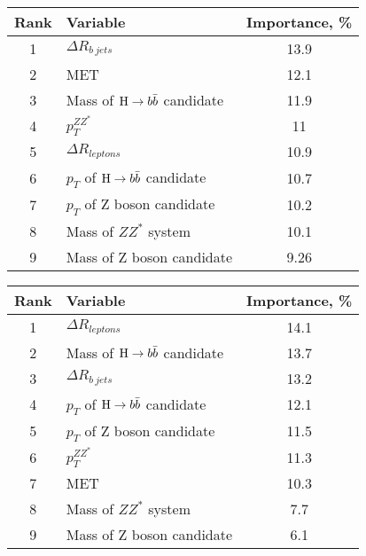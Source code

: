 \noindent\begin{table}
   \centering
   \begin{tabular}{|c| l |c|}\hline
     Rank & Variable & Importance, \% \\\hline
     1 & $\Delta R_{b\ jets}$ & 13.9 \\ 
     2 & MET & 12.1 \\ 
     3 & Mass of $\mathrm{H}\to b\bar{b}$ candidate & 11.9 \\ 
     4 & $p_T^{ZZ^*}$ & 11 \\ 
     5 & $\Delta R_{leptons}$ & 10.9 \\ 
     6 & $p_T$ of $\mathrm{H}\to b\bar{b}$ candidate & 10.7 \\ 
     7 & $p_T$ of Z boson candidate & 10.2 \\ 
     8 & Mass of $ZZ^*$ system & 10.1 \\ 
     9 & Mass of Z boson candidate & 9.26 \\ 
     \hline
   \end{tabular}
   \label{tab:test1}
\end{table}
\begin{table}
   \centering
   \begin{tabular}{|c| l |c|}\hline
     Rank & Variable & Importance, \% \\\hline
     1 & $\Delta R_{leptons}$ & 14.1 \\ 
     2 & Mass of $\mathrm{H}\to b\bar{b}$ candidate & 13.7 \\ 
     3 & $\Delta R_{b\ jets}$ & 13.2 \\ 
     4 & $p_T$ of $\mathrm{H}\to b\bar{b}$ candidate & 12.1 \\ 
     5 & $p_T$ of Z boson candidate & 11.5 \\ 
     6 & $p_T^{ZZ^*}$ & 11.3 \\ 
     7 & MET & 10.3 \\ 
     8 & Mass of $ZZ^*$ system & 7.7 \\ 
     9 & Mass of Z boson candidate & 6.1 \\ 
     \hline
   \end{tabular}
   \label{tab:test2}
\end{table}

